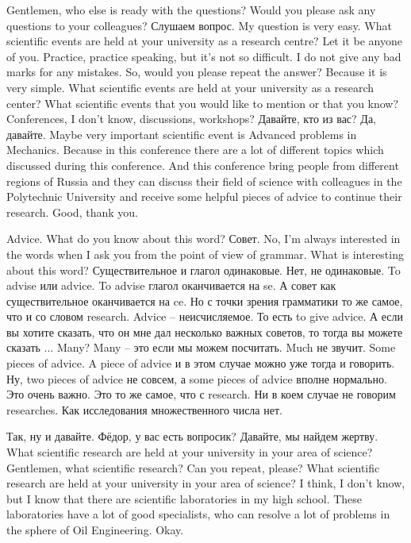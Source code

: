 \documentclass[main.tex]{subfiles}
\begin{document}
Gentlemen, who else is ready with the questions?
Would you please ask any questions to your colleagues?
Слушаем вопрос.
My question is very easy.
What scientific events are held at your university as a research centre?
Let it be anyone of you.
Practice, practice speaking, but it's not so difficult.
I do not give any bad marks for any mistakes.
So, would you please repeat the answer?
Because it is very simple.
What scientific events are held at your university as a research center?
What scientific events that you would like to mention or that you know?
Conferences, I don't know, discussions, workshops?
Давайте, кто из вас?
Да, давайте.
Maybe very important scientific event is Advanced problems in Mechanics.
Because in this conference there are a lot of different topics which discussed during this conference.
And this conference bring people from different regions of Russia and they can discuss their field of science with colleagues in the Polytechnic University and receive some helpful pieces of advice to continue their research.
Good, thank you.

Advice.
What do you know about this word?
Совет.
No, I'm always interested in the words when I ask you from the point of view of grammar.
What is interesting about this word?
Существительное и глагол одинаковые.
Нет, не одинаковые.
To advise или advice.
To advise глагол оканчивается на se.
А совет как существительное оканчивается на ce.
Но с точки зрения грамматики то же самое, что и со словом research.
Advice -- неисчисляемое.
То есть to give advice.
А если вы хотите сказать, что он мне дал несколько важных советов, то тогда вы можете сказать ...
Many?
Many -- это если мы можем посчитать.
Much не звучит.
Some pieces of advice.
A piece of advice и в этом случае можно уже тогда и говорить.
Ну, two pieces of advice не совсем, а some pieces of advice вполне нормально.
Это очень важно.
Это то же самое, что с research.
Ни в коем случае не говорим researches.
Как исследования множественного числа нет.

Так, ну и давайте.
Фёдор, у вас есть вопросик?
Давайте, мы найдем жертву.
What scientific research are held at your university in your area of science?
Gentlemen, what scientific research?
Can you repeat, please?
What scientific research are held at your university in your area of science?
I think, I don't know, but I know that there are scientific laboratories in my high school.
These laboratories have a lot of good specialists, who can resolve a lot of problems in the sphere of Oil Engineering.
Okay.
\end{document}
